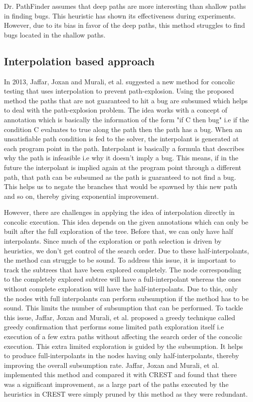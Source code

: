 \documentclass[ runningheads,
               a4paper]{llncs}
\begin{document}
Dr. PathFinder assumes that deep paths are more interesting than shallow paths in finding bugs. This heuristic has shown its effectiveness during experiments. However, due to its bias in favor of the deep paths, this method struggles to find bugs located in the shallow paths.




\subsection{Interpolation based approach}
In 2013, Jaffar, Joxan and Murali, et al. suggested a new method \cite{jaffar2013boosting} for concolic testing that uses interpolation to prevent path-explosion. Using the proposed method the paths that are not guaranteed to hit a bug are subsumed which helps to deal with the path-explosion problem. The idea works with a concept of annotation which is basically the  information of the form "if C then bug" i.e if the condition C evaluates to true along the path then the path has a bug. When an unsatisfiable path condition is fed to the solver, the interpolant is generated at each program point in the path. Interpolant is basically a formula that describes why the path is infeasible i.e why it doesn't imply a bug. This means, if in the future the interpolant is implied again at the program point through a different path, that path can be subsumed as the path is guaranteed to not find a bug. This helps us to negate the branches that would be spawned by this new path and so on, thereby giving exponential improvement.


However, there are challenges \cite{jaffar2013boosting} in applying the idea of interpolation directly in concolic execution. This idea depends on the given annotations which can only be built after the full exploration of the tree. Before that, we can only have half interpolants. Since much of the exploration or path selection is driven by heuristics, we don't get control of the search order. Due to these half-interpolants, the method can struggle to be sound. To address this issue, it is important to track the subtrees that have been explored completely. The node corresponding to the completely explored subtree will have a full-interpolant whereas the ones without complete exploration will have the half-interpolants. Due to this, only the nodes with full interpolants can perform subsumption if the method has to be sound. This limits the number of subsumption that can be performed. To tackle this issue, Jaffar, Joxan and Murali, et al. \cite{jaffar2013boosting} proposed a greedy technique called greedy confirmation that performs some limited path exploration itself i.e execution of a few extra paths without affecting the search order of the concolic execution. This extra limited exploration is guided by the subsumption. It helps to produce full-interpolants in the nodes having only half-interpolants, thereby improving the overall subsumption rate. Jaffar, Joxan and Murali, et al. \cite{jaffar2013boosting} implemented this method and compared it with CREST
\cite{kousik2008heuristic} and found that there was a significant improvement, as a large part of the paths executed by the heuristics in CREST were simply pruned by this method as they were redundant.
\end{document}
